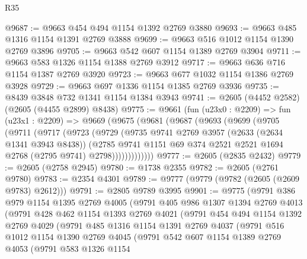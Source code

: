 \begin{lexlean}{R35}
\begin{coremodule}
@9687 := @9663 @454 @494 @1154 @1392 @2769 @3880
@9693 := @9663 @485 @1316 @1154 @1391 @2769 @3888
@9699 := @9663 @516 @1012 @1154 @1390 @2769 @3896
@9705 := @9663 @542 @607 @1154 @1389 @2769 @3904
@9711 := @9663 @583 @1326 @1154 @1388 @2769 @3912
@9717 := @9663 @636 @716 @1154 @1387 @2769 @3920
@9723 := @9663 @677 @1032 @1154 @1386 @2769 @3928
@9729 := @9663 @697 @1336 @1154 @1385 @2769 @3936
@9735 := @8439 @3848 @732 @1341 @1154 @1384 @3943
@9741 := @2605 (@4452 @2582) (@2605 (@4455 @2899) @8438)
@9775 := @9661
    (fun (u23x0 : @2209) =>
    fun (u23x1 : @2209) =>
    @9669
      (@9675
        (@9681
          (@9687
            (@9693
              (@9699
                (@9705
                  (@9711
                    (@9717
                      (@9723
                        (@9729
                          (@9735
                            @9741
                            @2769
                            @3957
                            (@2633 (@2634 @1341 @3943 @8438))
                            (@2785
                              @9741
                              @1151
                              @69
                              @374
                              @2521
                              @2521
                              @1694
                              @2768
                              (@2795 @9741)
                              @2798)))))))))))))
@9777 := @2605 (@2835 @2432)
@9779 := @2605 (@2758 @2945)
@9780 := @1738 @2355
@9782 := @2605 (@2761 @9780)
@9783 := @2354 @4301
@9789 := @9777 (@9779 (@9782 (@2605 (@2609 @9783) @2612)))
@9791 := @2805 @9789 @3995
@9901 := @9775
    (@9791
      @386
      @979
      @1154
      @1395
      @2769
      @4005
      (@9791
        @405
        @986
        @1307
        @1394
        @2769
        @4013
        (@9791
          @428
          @462
          @1154
          @1393
          @2769
          @4021
          (@9791
            @454
            @494
            @1154
            @1392
            @2769
            @4029
            (@9791
              @485
              @1316
              @1154
              @1391
              @2769
              @4037
              (@9791
                @516
                @1012
                @1154
                @1390
                @2769
                @4045
                (@9791
                  @542
                  @607
                  @1154
                  @1389
                  @2769
                  @4053
                  (@9791
                    @583
                    @1326
                    @1154

\end{coremodule}
\end{lexlean}

